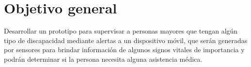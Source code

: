 \section{Objetivo general}

Desarrollar un prototipo para supervisar a personas mayores que tengan algún tipo de discapacidad mediante alertas a un dispositivo móvil, que serán generadas por sensores para brindar información de algunos signos vitales de importancia y podrán determinar si la persona necesita alguna asistencia médica.

   